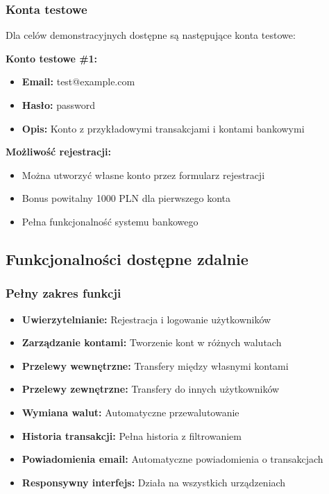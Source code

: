 \documentclass[12pt,a4paper]{article}
\begin{document}
    \subsubsection{Konta testowe}

    Dla celów demonstracyjnych dostępne są następujące konta testowe:

    \textbf{Konto testowe \#1:}
    \begin{itemize}
        \item \textbf{Email:} test@example.com
        \item \textbf{Hasło:} password
        \item \textbf{Opis:} Konto z przykładowymi transakcjami i kontami bankowymi
    \end{itemize}

    \textbf{Możliwość rejestracji:}
    \begin{itemize}
        \item Można utworzyć własne konto przez formularz rejestracji
        \item Bonus powitalny 1000 PLN dla pierwszego konta
        \item Pełna funkcjonalność systemu bankowego
    \end{itemize}

    \subsection{Funkcjonalności dostępne zdalnie}

    \subsubsection{Pełny zakres funkcji}

    \begin{itemize}
        \item \textbf{Uwierzytelnianie:} Rejestracja i logowanie użytkowników
        \item \textbf{Zarządzanie kontami:} Tworzenie kont w różnych walutach
        \item \textbf{Przelewy wewnętrzne:} Transfery między własnymi kontami
        \item \textbf{Przelewy zewnętrzne:} Transfery do innych użytkowników
        \item \textbf{Wymiana walut:} Automatyczne przewalutowanie
        \item \textbf{Historia transakcji:} Pełna historia z filtrowaniem
        \item \textbf{Powiadomienia email:} Automatyczne powiadomienia o transakcjach
        \item \textbf{Responsywny interfejs:} Działa na wszystkich urządzeniach
    \end{itemize}
\end{document}
